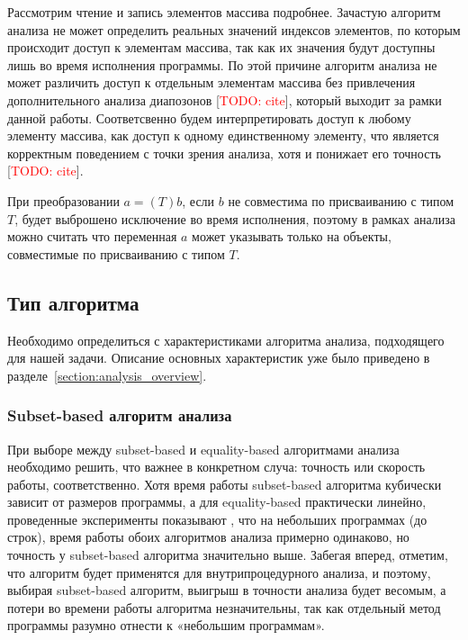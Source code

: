 \documentclass[14pt,titlepage]{extarticle}
\newcommand{\num}[1]{\numprint{#1}}
\newcommand{\todo}[1]{\textcolor{red}{\eng{TODO}: #1}}
\newcommand{\todocite}{[\todo{cite}]}
\newcommand{\eng}[1]{{\English#1}}
\begin{document}
      Рассмотрим чтение и запись элементов массива подробнее. Зачастую
      алгоритм анализа не может определить реальных значений индексов
      элементов, по которым происходит доступ к элементам массива, так как их
      значения будут доступны лишь во время исполнения программы.
      По этой причине алгоритм анализа не может различить доступ к отдельным
      элементам массива без привлечения дополнительного анализа диапозонов
      \todocite, который выходит за рамки данной работы.
      Соответсвенно будем интерпретировать доступ к любому элементу массива,
      как доступ к одному единственному элементу, что является корректным
      поведением с точки зрения анализа, хотя и понижает его точность
      \todocite.

      При преобразовании $a = (T)b$, если $b$ не совместима по
      присваиванию с типом $T$, будет выброшено исключение во время
      исполнения, поэтому в рамках анализа можно считать что переменная $a$
      может указывать только на объекты, совместимые по присваиванию с типом
      $T$.

    \subsection{Тип алгоритма}

      Необходимо определиться с характеристиками алгоритма анализа,
      подходящего для нашей задачи. Описание основных характеристик уже было
      приведено в разделе~\ref{section:analysis_overview}.

    \subsubsection{\eng{Subset-based} алгоритм анализа}

      При выборе между \eng{subset-based} и \eng{equality-based} алгоритмами
      анализа необходимо решить, что важнее в конкретном случа:
      точность или скорость работы, соответственно.
      Хотя время работы \eng{subset-based} алгоритма кубически зависит от
      размеров программы, а для \eng{equality-based} практически линейно,
      проведенные эксперименты показывают \cite{shapiro_fast_and_accurate}, что
      на небольших программах (до \num{3000} строк), время работы обоих
      алгоритмов анализа примерно одинаково, но точность у \eng{subset-based}
      алгоритма значительно выше.
      Забегая вперед, отметим, что алгоритм будет применятся для
      внутрипроцедурного анализа, и поэтому, выбирая \eng{subset-based}
      алгоритм, выигрыш в точности анализа будет весомым, а потери во времени
      работы алгоритма незначительны, так как отдельный метод программы
      разумно отнести к «небольшим программам».
\end{document}
